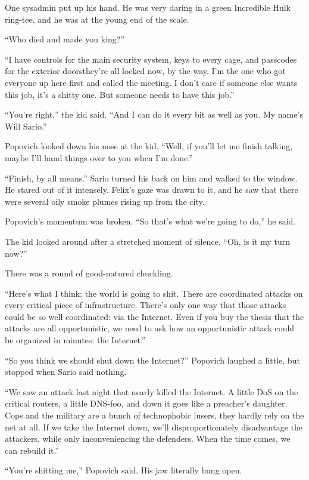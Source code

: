 One sysadmin put up his hand. He was very daring in a green
Incredible Hulk ring-tee, and he was at the young end of the
scale.

“Who died and made you king?”

“I have controls for the main security system, keys to every cage,
and passcodes for the exterior doors\dash{}they’re all locked now, by the
way. I’m the one who got everyone up here first and called the
meeting. I don’t care if someone else wants this job, it’s a shitty
one. But someone needs to have this job.”

“You’re right,” the kid said. “And I can do it every bit as well as
you. My name’s Will Sario.”

Popovich looked down his nose at the kid. “Well, if you’ll let me
finish talking, maybe I’ll hand things over to you when I’m done.”

“Finish, by all means.” Sario turned his back on him and walked to
the window. He stared out of it intensely. Felix’s gaze was drawn
to it, and he saw that there were several oily smoke plumes rising
up from the city.

Popovich’s momentum was broken. “So that’s what we’re going to do,”
he said.

The kid looked around after a stretched moment of silence. “Oh, is
it my turn now?”

There was a round of good-natured chuckling.

“Here’s what I think: the world is going to shit. There are
coordinated attacks on every critical piece of infrastructure.
There’s only one way that those attacks could be so well
coordinated: via the Internet. Even if you buy the thesis that the
attacks are all opportunistic, we need to ask how an opportunistic
attack could be organized in minutes: the Internet.”

“So you think we should shut down the Internet?” Popovich laughed a
little, but stopped when Sario said nothing.

“We saw an attack last night that nearly killed the Internet. A
little DoS on the critical routers, a little DNS-foo, and down it
goes like a preacher’s daughter. Cops and the military are a bunch
of technophobic lusers, they hardly rely on the net at all. If we
take the Internet down, we’ll disproportionately disadvantage the
attackers, while only inconveniencing the defenders. When the time
comes, we can rebuild it.”

“You’re shitting me,” Popovich said. His jaw literally hung open.


